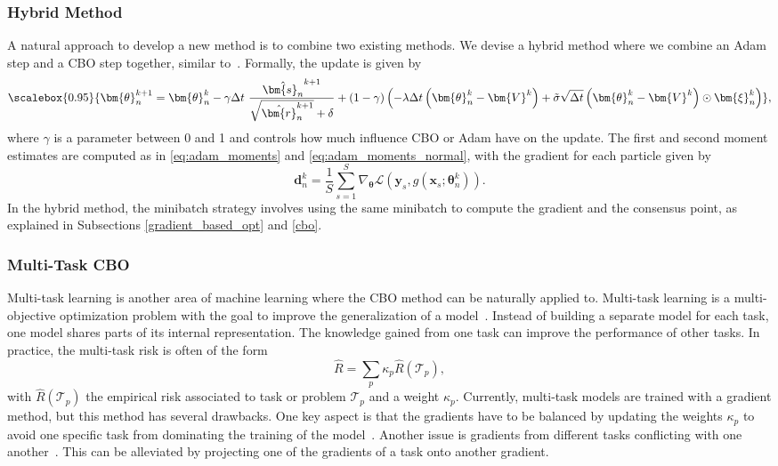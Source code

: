 \documentclass[a4paper, 11pt]{article}
\newcommand{\btheta}{\bm{\theta}}
\newcommand\scalemath[2]{\scalebox{#1}{\mbox{\ensuremath{\displaystyle #2}}}}
\theoremstyle{plain} %
\begin{document}
	\subsubsection{Hybrid Method}
	A natural approach to develop a new method is to combine two existing methods. We devise a hybrid method where we combine an Adam step and a CBO step together, similar to~\cite{wei2025}. Formally, the update is given by
	\begin{equation}
	\scalemath{0.95}{
    \bm{\theta}^{k+1}_{n} = \bm{\theta}^{k}_{n} - \gamma\Delta t~\frac{\hat{\bm{s}_{n}}^{k+1}}{\sqrt{\hat{\bm{r}}_{n}^{k+1}} + \delta} + \left( 1 - \gamma \right)\left( - \lambda \Delta t\left(\bm{\theta}_n^k - \bm{V}^k \right) + \tilde{\sigma} \sqrt{\Delta t}\left(\bm{\theta}_n^k - \bm{V}^k \right) \odot \bm{\xi}_n^k \right)},
	\end{equation}
	where $ \gamma $ is a parameter between 0 and 1 and controls how much influence CBO or Adam have on the update. The first and second moment estimates are computed as in \eqref{eq:adam_moments} and \eqref{eq:adam_moments_normal}, with the gradient for each particle given by
	\begin{equation}
		\bm{d}_{n}^{k} = \frac{1}{S}\sum_{s=1}^{S} \nabla_{\btheta} \mathcal{L}\left(\bm{y}_{s}, \hat{g}(\bm{x}_{s};\btheta_{n}^{k}) \right).
	\end{equation} 
	In the hybrid method, the minibatch strategy involves using the same minibatch to compute the gradient and the consensus point, as explained in Subsections \ref{gradient_based_opt} and \ref{cbo}.

	\subsubsection{Multi-Task CBO}

	Multi-task learning is another area of machine learning where the CBO method can be naturally applied to. Multi-task learning is a multi-objective optimization problem with the goal to improve the generalization of a model~\cite{caruana1997}. Instead of building a separate model for each task, one model shares parts of its internal representation. The knowledge gained from one task can improve the performance of other tasks. In practice, the multi-task risk is often of the form 
	\begin{equation}
		\hat{R} = \sum_{p} \kappa_{p}\hat{R}\left( \mathcal{T}_{p} \right),
	\end{equation}
	with $ \hat{R}\left( \mathcal{T}_{p} \right) $ the empirical risk associated to task or problem $ \mathcal{T}_{p} $ and a weight $ \kappa_{p} $. Currently, multi-task models are trained with a gradient method, but this method has several drawbacks. One key aspect is that the gradients have to be balanced by updating the weights $ \kappa_{p}$ to avoid one specific task from dominating the training of the model~\cite{chen2018gradnorm}. Another issue is gradients from different tasks conflicting with one another~\cite{yu2020gradient}. This can be alleviated by projecting one of the gradients of a task onto another gradient.
\end{document}

